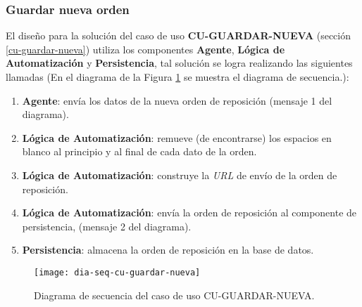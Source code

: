 \subsubsection{Guardar nueva orden}
El diseño para la solución del caso de uso \textbf{CU-GUARDAR-NUEVA} (sección \ref{cu-guardar-nueva}) utiliza los componentes \textbf{Agente}, \textbf{Lógica de Automatización} y \textbf{Persistencia}, tal solución se logra realizando las siguientes llamadas (En el diagrama de la Figura \ref{fig:dia-seq-cu-guardar-nueva} se muestra el diagrama de secuencia.):
\begin{enumerate}
	\item \textbf{Agente}: envía los datos de la nueva orden de reposición (mensaje 1 del diagrama).
	\item \textbf{Lógica de Automatización}: remueve (de encontrarse) los espacios en blanco al principio y al final de cada dato de la orden.
	\item \textbf{Lógica de Automatización}: construye la \textit{URL} de envío de la orden de reposición.
	\item \textbf{Lógica de Automatización}: envía la orden de reposición al componente de persistencia, (mensaje 2 del diagrama).
	\item \textbf{Persistencia}: almacena la orden de reposición en la base de datos.
\end{enumerate}

\begin{figure}[h]
	\centering
	\texttt{[image: dia-seq-cu-guardar-nueva]}
	\caption{Diagrama de secuencia del caso de uso CU-GUARDAR-NUEVA.}
	\label{fig:dia-seq-cu-guardar-nueva}
\end{figure}

